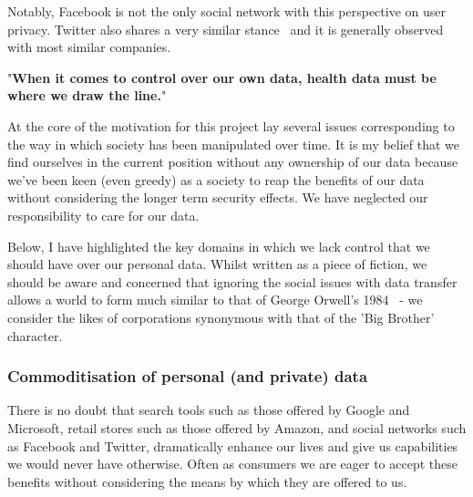 Notably, Facebook is not the only social network with this perspective on user privacy. Twitter also shares a very similar stance~\autocite{twittertos:2017:online} and it is generally observed with most similar companies.

\begin{displayquote}{
  "\textbf{When it comes to control over our own data, health data must be where we draw the line.}"~\autocite{wilbankstopol:2016:article}
}\end{displayquote}




At the core of the motivation for this project lay several issues corresponding to the way in which society has been manipulated over time. It is my belief that we find ourselves in the current position without any ownership of our data because we've been keen (even greedy) as a society to reap the benefits of our data without considering the longer term security effects. We have neglected our responsibility to care for our data.

Below, I have highlighted the key domains in which we lack control that we should have over our personal data. Whilst written as a piece of fiction, we should be aware and concerned that ignoring the social issues with data transfer allows a world to form much similar to that of George Orwell's 1984~\autocite{orwell:1984:book} - we consider the likes of corporations synonymous with that of the 'Big Brother' character.

\subsubsection{Commoditisation of personal (and private) data}

There is no doubt that search tools such as those offered by Google and Microsoft, retail stores such as those offered by Amazon, and social networks such as Facebook and Twitter, dramatically enhance our lives and give us capabilities we would never have otherwise. Often as consumers we are eager to accept these benefits without considering the means by which they are offered to us.

